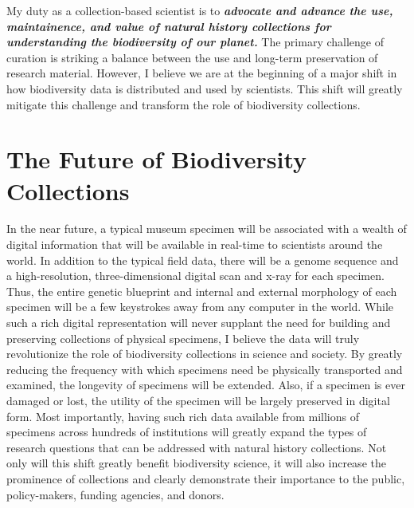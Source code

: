 \documentclass[10pt]{article}
\begin{document}
\raggedright
\singlespacing

My duty as a collection-based scientist is to \textbf{\textit{advocate and
advance the use, maintainence, and value of natural history collections for
understanding the biodiversity of our planet.}}
The primary challenge of curation is striking a balance between the use and
long-term preservation of research material.
However, I believe we are at the beginning of a major shift in how
biodiversity data is distributed and used by scientists.
This shift will greatly mitigate this challenge and transform the role of
biodiversity collections.

\section*{The Future of Biodiversity Collections}
In the near future, a typical museum specimen will be associated
with a wealth of digital information that will be available in real-time
to scientists around the world.
In addition to the typical field data, there will be a genome sequence
and a high-resolution, three-dimensional digital scan and x-ray for each
specimen.
Thus, the entire genetic blueprint and internal and external morphology of 
each specimen will be a few keystrokes away from any computer in the world.
While such a rich digital representation will never supplant the need for
building and preserving collections of physical specimens, I believe the data
will truly revolutionize the role of biodiversity collections in science and
society.
By greatly reducing the frequency with which specimens need be physically
transported and examined, the longevity of specimens will be extended.
Also, if a specimen is ever damaged or lost, the utility of the specimen will
be largely preserved in digital form.
Most importantly, having such rich data available from millions of specimens
across hundreds of institutions will greatly expand the types of research
questions that can be addressed with natural history collections.
Not only will this shift greatly benefit biodiversity science, it will also
increase the prominence of collections and clearly demonstrate their importance
to the public, policy-makers, funding agencies, and donors.
\end{document}
